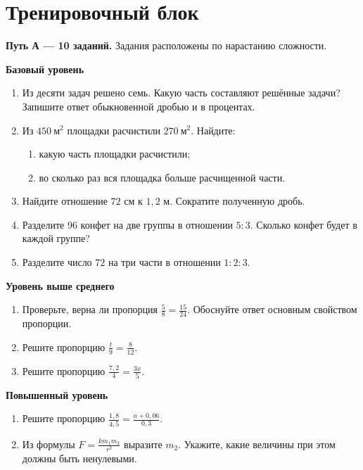 \documentclass[a4paper,12pt]{article}
\begin{document}
\section*{Тренировочный блок}
\textcolor{darkaccent}{\textbf{Путь А --- 10 заданий.}} Задания расположены по нарастанию сложности.\par
\textbf{Базовый уровень}
\begin{enumerate}[itemsep=5pt]
\item Из десяти задач решено семь. Какую часть составляют решённые задачи? Запишите ответ обыкновенной дробью и в процентах.
\item Из $450\ \text{м}^2$ площадки расчистили $270\ \text{м}^2$. Найдите:
  \begin{enumerate}[label=\alph*),nosep,topsep=2pt]
  \item какую часть площадки расчистили;
  \item во сколько раз вся площадка больше расчищенной части.
  \end{enumerate}
\item Найдите отношение $72$ см к $1{,}2$ м. Сократите полученную дробь.
\item Разделите $96$ конфет на две группы в отношении $5:3$. Сколько конфет будет в каждой группе?
\item Разделите число $72$ на три части в отношении $1:2:3$.
\end{enumerate}
\medskip\textbf{Уровень выше среднего}
\begin{enumerate}[start=6,itemsep=6pt]
\item Проверьте, верна ли пропорция $\displaystyle\frac58=\frac{15}{24}$. Обоснуйте ответ основным свойством пропорции.
\item Решите пропорцию $\displaystyle\frac{t}{9}=\frac8{12}$.
\item Решите пропорцию $\displaystyle\frac{7{,}2}{4}=\frac{3x}{5}$.
\end{enumerate}
\medskip\textbf{Повышенный уровень}
\begin{enumerate}[start=9,itemsep=6pt]
\item Решите пропорцию $\displaystyle\frac{1{,}8}{4{,}5}=\frac{a+0{,}06}{0{,}3}$.
\item Из формулы $\displaystyle F=\frac{k m_1m_2}{r^2}$ выразите $m_2$. Укажите, какие величины при этом должны быть ненулевыми.
\end{enumerate}
\clearpage
\end{document}
